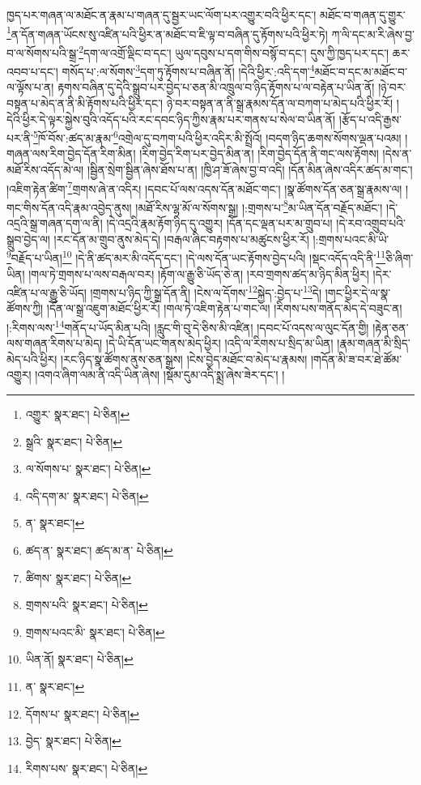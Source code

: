 ཁྱད་པར་གཞན་ལ་མཐོང་ན་རྣམ་པ་གཞན་དུ་སྦྱར་ཡང་ལོག་པར་འགྱུར་བའི་ཕྱིར་དང་། མཐོང་བ་གཞན་དུ་གྱུར་\footnote{འགྱུར་  སྣར་ཐང་།  པེ་ཅིན། }ན་དོན་གཞན་ཡོངས་སུ་འཛིན་པའི་ཕྱིར་ན་མཐོང་བ་ཇི་ལྟ་བ་བཞིན་དུ་རྟོགས་པའི་ཕྱིར་ཏེ། ཀ་ལི་དང་མ་རི་ཞེས་བྱ་བ་ལ་སོགས་པའི་སྒྲ་\footnote{སྒྲའི་  སྣར་ཐང་།  པེ་ཅིན། }དག་ལ་འགྲོ་ལྡིང་བ་དང་། ཡུལ་དབུས་པ་དག་གིས་བསྙོ་བ་དང་། དུས་ཀྱི་ཁྱད་པར་དང་། ཆར་འབབ་པ་དང་། གསོད་པ་:ལ་སོགས་\footnote{ལ་སོགས་པ་  སྣར་ཐང་།  པེ་ཅིན། }དག་ཏུ་རྟོགས་པ་བཞིན་ནོ། །དེའི་ཕྱིར་:འདི་དག་\footnote{འདི་དག་མ་  སྣར་ཐང་།  པེ་ཅིན། }མཐོང་བ་དང་མ་མཐོང་བ་ལ་ལྟོས་པ་ན། རྟགས་བཞིན་དུ་དེའི་སྒྲུབ་པར་བྱེད་པ་ཅན་མི་འཁྲུལ་བ་ཉིད་རྟོགས་པ་ལ་བརྟེན་པ་ཡིན་ནོ། །ཉེ་བར་བསྟན་པ་མེད་ན་ནི་མི་རྟོགས་པའི་ཕྱིར་དང་། ཉེ་བར་བསྟན་ན་ནི་སྒྲ་རྣམས་དོན་ལ་བཀག་པ་མེད་པའི་ཕྱིར་རོ། །དེའི་ཕྱིར་དེ་ལྟར་སྐྱེས་བུའི་འདོད་པའི་རང་དབང་ཉིད་ཀྱིས་རྣམ་པར་གནས་པ་སེལ་བ་ཡིན་ནོ། །རྩོད་པ་འདི་རྒྱས་པར་ནི་\footnote{ན་  སྣར་ཐང་། }ཁོ་བོས་:ཚད་མ་རྣམ་\footnote{ཚད་ན་  སྣར་ཐང་། ཚད་མ་ན་  པེ་ཅིན། }འགྲེལ་དུ་བཀག་པའི་ཕྱིར་འདིར་མི་སྤྲོའོ། །བདག་ཉིད་ཆགས་སོགས་ལྡན་པའམ། །གཞན་ལས་རིག་བྱེད་དོན་རིག་མིན། །རིག་བྱེད་རིག་པར་བྱེད་མིན་ན། །རིག་བྱེད་དོན་ནི་གང་ལས་རྟོགས། །དེས་ན་མཐོ་རིས་འདོད་མེ་ལ། །སྦྱིན་སྲེག་སྦྱིན་ཞེས་ཐོས་པ་ན། །ཁྱི་ཤ་ཟོ་ཞེས་བྱ་བ་འདི། །དོན་མིན་ཞེས་འདིར་ཚད་མ་གང་། །འཇིག་རྟེན་ཚིག་\footnote{ཚིགས་  སྣར་ཐང་།  པེ་ཅིན། }གྲགས་ཞེ་ན་འདིར། །དབང་པོ་ལས་འདས་དོན་མཐོང་གང་། །སྣ་ཚོགས་དོན་ཅན་སྒྲ་རྣམས་ལ། །གང་གིས་དོན་འདི་རྣམ་འབྱེད་ནུས། །མཐོ་རིས་ལྷ་མོ་ལ་སོགས་སྒྲ། །:གྲགས་པ་\footnote{གྲགས་པའི་  སྣར་ཐང་།  པེ་ཅིན། }མ་ཡིན་དོན་བརྗོད་མཐོང་། །དེ་འདྲའི་སྒྲ་གཞན་དག་ལ་ནི། །དེ་འདྲའི་རྣམ་རྟོག་ཉིད་དུ་འགྱུར། །དོན་དང་ལྡན་པར་མ་གྲུབ་པ། །དེ་རབ་འགྲུབ་པའི་སྒྲུབ་བྱེད་ལ། །རང་དོན་མ་གྲུབ་ནུས་མེད་དེ། །བརྒལ་ཞིང་བརྟགས་པ་མཚུངས་ཕྱིར་རོ། །:གྲགས་པའང་མི་ཡི་\footnote{གྲགས་པའང་མི་  སྣར་ཐང་།  པེ་ཅིན། }བརྗོད་པ་ཡིན།\footnote{ཡིན་ནོ།  སྣར་ཐང་།  པེ་ཅིན། } །དེ་ནི་ཚད་མར་མི་འདོད་དང་། །དེ་ལས་དོན་ཡང་རྟོགས་བྱེད་པའི། །སྡང་འདོད་འདི་ནི་\footnote{ན་  སྣར་ཐང་། }ཅི་ཞིག་ཡིན། །གལ་ཏེ་གྲགས་པ་ལས་བརྒལ་བར། །རྟོག་ལ་རྒྱུ་ཅི་ཡོད་ཅེ་ན། །རབ་གྲགས་ཚད་མ་ཉིད་མིན་ཕྱིར། །དེར་འཛིན་པ་ལ་རྒྱུ་ཅི་ཡོད། །གྲགས་པ་ཉིད་ཀྱི་སྒྲ་དོན་ནི། །ངེས་ལ་དོགས་\footnote{དོགས་པ་  སྣར་ཐང་།  པེ་ཅིན། }སྐྱེད་:བྱེད་པ་\footnote{བྱེད་  སྣར་ཐང་།  པེ་ཅིན། }དེ། །གང་ཕྱིར་དེ་ལ་སྣ་ཚོགས་ཀྱི། །དོན་ལ་སྒྲ་འཇུག་མཐོང་ཕྱིར་རོ། །གལ་ཏེ་འཇིག་རྟེན་པ་གང་ལ། །རིགས་པས་གནོད་མེད་དེ་བཟུང་ན། །:རིགས་ལས་\footnote{རིགས་པས་  སྣར་ཐང་།  པེ་ཅིན། }གནོད་པ་ཡོད་མིན་པའི། །རླུང་གི་བུ་དེ་ཅིས་མི་འཛིན། །དབང་པོ་འདས་ལ་ལུང་དོན་གྱི། །རྟེན་ཅན་ལས་གཞན་རིགས་པ་མེད། །དེ་ཡི་དོན་ཡང་གནས་མེད་ཕྱིར། །འདི་ལ་རིགས་པ་སྲིད་མ་ཡིན། །རྣམ་གཞན་མི་སྲིད་མེད་པའི་ཕྱིར། །རང་ཉིད་སྣ་ཚོགས་ནུས་ཅན་སྒྲས། །ངེས་བྱེད་མཐོང་བ་མེད་པ་རྣམས། །གདོན་མི་ཟ་བར་ཐེ་ཚོམ་འགྱུར། །འགའ་ཞིག་ལམ་ནི་འདི་ཡིན་ཞེས། །སྡོམ་དུམ་འདི་སྨྲ་ཞེས་ཟེར་དང་། །
